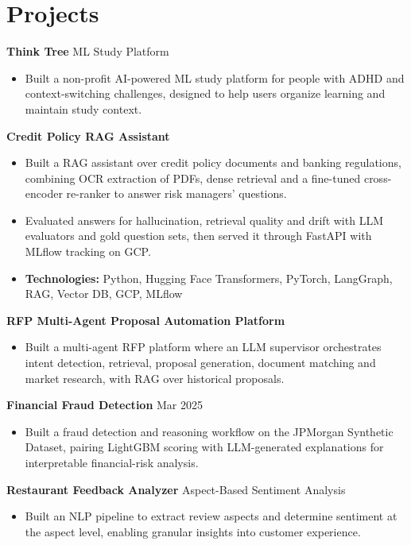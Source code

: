 \documentclass[10pt,a4paper]{article}
\begin{document}
\section{Projects}
\textbf{Think Tree} \textbar{} ML Study Platform\par
\begin{itemize}
  \item Built a non-profit AI-powered ML study platform for people with ADHD and context-switching challenges, designed to help users organize learning and maintain study context.
\end{itemize}
\textbf{Credit Policy RAG Assistant}\par
\begin{itemize}
  \item Built a RAG assistant over credit policy documents and banking regulations, combining OCR extraction of PDFs, dense retrieval and a fine-tuned cross-encoder re-ranker to answer risk managers' questions.
  \item Evaluated answers for hallucination, retrieval quality and drift with LLM evaluators and gold question sets, then served it through FastAPI with MLflow tracking on GCP.
  \item \textbf{Technologies:} Python, Hugging Face Transformers, PyTorch, LangGraph, RAG, Vector DB, GCP, MLflow
\end{itemize}
\textbf{RFP Multi-Agent Proposal Automation Platform}\par
\begin{itemize}
  \item Built a multi-agent RFP platform where an LLM supervisor orchestrates intent detection, retrieval, proposal generation, document matching and market research, with RAG over historical proposals.
\end{itemize}
\textbf{Financial Fraud Detection} \textbar{} Mar 2025\par
\begin{itemize}
  \item Built a fraud detection and reasoning workflow on the JPMorgan Synthetic Dataset, pairing LightGBM scoring with LLM-generated explanations for interpretable financial-risk analysis.
\end{itemize}
\textbf{Restaurant Feedback Analyzer} \textbar{} Aspect-Based Sentiment Analysis\par
\begin{itemize}
  \item Built an NLP pipeline to extract review aspects and determine sentiment at the aspect level, enabling granular insights into customer experience.
\end{itemize}
\end{document}
